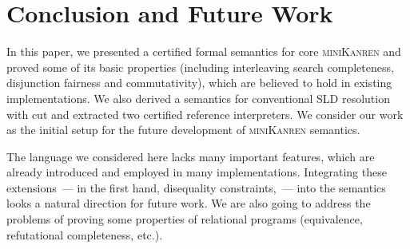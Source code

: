 \section{Conclusion and Future Work}

In this paper, we presented a certified formal semantics for core \textsc{miniKanren} and proved some of its basic properties
(including interleaving search completeness, disjunction fairness and commutativity), which are believed to hold in existing implementations.
We also derived a semantics for conventional SLD resolution with cut and extracted two certified reference interpreters.
We consider our work as the initial setup for the future development of \textsc{miniKanren} semantics.

The language we considered here lacks many important features, which are already introduced
and employed in many implementations. Integrating these extensions~--- in the first hand, disequality constraints,~--- into
the semantics looks a natural direction for future work. We are also going to address the problems of proving some
properties of relational programs (equivalence, refutational completeness, etc.).
